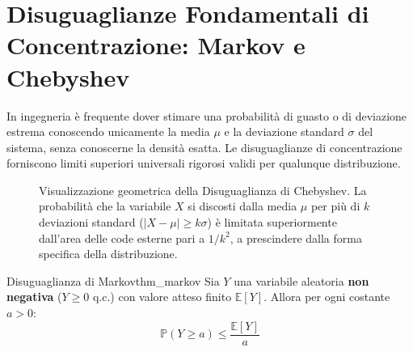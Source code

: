\section{Disuguaglianze Fondamentali di Concentrazione: Markov e Chebyshev}
\label{sec:disuguaglianze_concentrazione}

In ingegneria è frequente dover stimare una probabilità di guasto o di deviazione estrema conoscendo unicamente la media $\mu$ e la deviazione standard $\sigma$ del sistema, senza conoscerne la densità esatta. Le disuguaglianze di concentrazione forniscono limiti superiori universali rigorosi validi per qualunque distribuzione.

\begin{figure}[htbp]
    \centering
    
    \caption{Visualizzazione geometrica della Disuguaglianza di Chebyshev. La probabilità che la variabile $X$ si discosti dalla media $\mu$ per più di $k$ deviazioni standard ($|X - \mu| \ge k\sigma$) è limitata superiormente dall'area delle code esterne pari a $1/k^2$, a prescindere dalla forma specifica della distribuzione.}
    \label{fig:disuguaglianza_chebyshev}
\end{figure}

\begin{teorema}{Disuguaglianza di Markov}{thm_markov}
Sia $Y$ una variabile aleatoria \textbf{non negativa} ($Y \ge 0$ q.c.) con valore atteso finito $\mathbb{E}[Y]$. Allora per ogni costante $a > 0$:
\begin{equation}
    \mathbb{P}(Y \ge a) \le \frac{\mathbb{E}[Y]}{a}
\end{equation}
\end{teorema}

